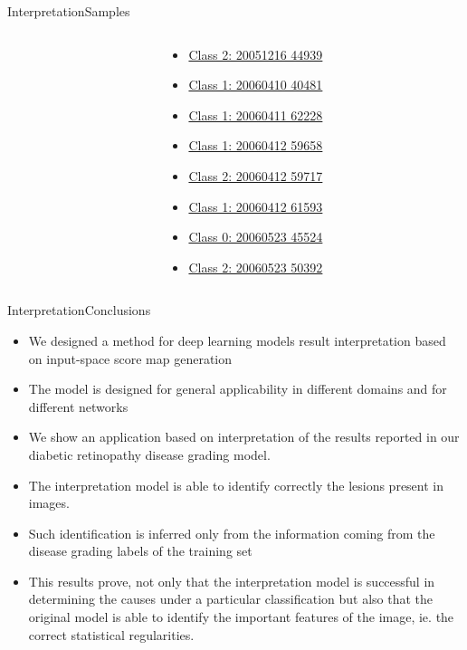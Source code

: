 \documentclass{beamer}
\begin{document}
\begin{frame}{Interpretation}{Samples}
\begin{columns}
\begin{column}{0.5\textwidth}
\end{column}
	\begin{column}{0.5\textwidth}
\begin{itemize}
\item \href{file:///home/jordi/Escritorio/PhD-Defense-2019-presentation/videos_scores/20051216_44939_0200_PP.mp4}{Class 2: 20051216 44939}
\item \href{file:///home/jordi/Escritorio/PhD-Defense-2019-presentation/videos_scores/20060410_40481_0200_PP.mp4}{Class 1: 20060410 40481}
\item \href{file:///home/jordi/Escritorio/PhD-Defense-2019-presentation/videos_scores/20060411_62228_0200_PP.mp4}{Class 1: 20060411 62228}
\item \href{file:///home/jordi/Escritorio/PhD-Defense-2019-presentation/videos_scores/20060412_59658_0200_PP.mp4}{Class 1: 20060412 59658}
\item \href{file:///home/jordi/Escritorio/PhD-Defense-2019-presentation/videos_scores/20060412_59717_0200_PP.mp4}{Class 2: 20060412 59717}
\item \href{file:///home/jordi/Escritorio/PhD-Defense-2019-presentation/videos_scores/20060412_61593_0200_PP.mp4}{Class 1: 20060412 61593}
\item \href{file:///home/jordi/Escritorio/PhD-Defense-2019-presentation/videos_scores/20060523_45524_0100_PP.mp4}{Class 0: 20060523 45524}
\item \href{file:///home/jordi/Escritorio/PhD-Defense-2019-presentation/videos_scores/20060523_50392_0100_PP.mp4}{Class 2: 20060523 50392}
\end{itemize}
	\end{column}
\end{columns}
\end{frame}

\begin{frame}{Interpretation}{Conclusions}	
\begin{itemize}
	\item We designed a method for deep learning models result interpretation based on input-space score map generation
	\item The model is designed for general applicability in different domains and for different networks
	\item We show an application based on interpretation of the results reported in our diabetic retinopathy disease grading model.
	\item The interpretation model is able to identify correctly the lesions present in images.
	\item Such identification is inferred only from the information coming from the disease grading labels of the training set
	\item This results prove, not only that the interpretation model is successful in determining the causes under a particular classification but also that the original model is able to identify the important features of the image, ie. the correct statistical regularities.
\end{itemize}
\end{frame}
\end{document}
